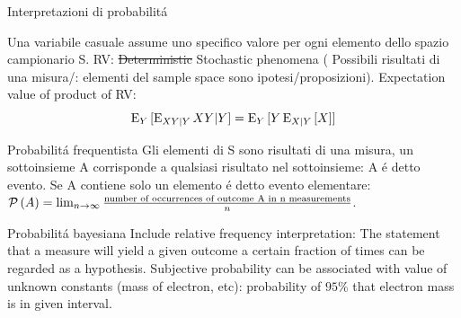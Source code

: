 \documentclass[asd-beamer.tex]{subfiles}%
\begin{document}
\begin{frame}{Interpretazioni di probabilit\'a}
\begin{block}{Una variabile casuale assume uno specifico valore per ogni elemento dello spazio campionario S.}
RV: \sout{Deterministic} Stochastic phenomena ( Possibili risultati di una misura/: elementi del sample space sono ipotesi/proposizioni). Expectation value of product of RV:%
\[\operatorname{E}_Y{[\operatorname{E}_{XY|Y}{XY|Y}]}=\operatorname{E}_Y{[Y\operatorname{E}_{X|Y}{[X]}]}\]
\end{block}
\begin{block}{Probabilit\'a frequentista}
Gli elementi di S sono risultati di una misura, un sottoinsieme A corrisponde a qualsiasi risultato nel sottoinsieme: A \'e detto evento. Se A contiene solo un elemento \'e detto evento elementare: $\operatorname{\mathcal{P}}{(A)}=\lim_{n\to\infty}\frac{\text{number of occurrences of outcome A in n measurements}}{n}$.
\end{block}
\begin{block}{Probabilit\'a bayesiana}
Include relative frequency interpretation: The statement that a measure will yield a given outcome a certain fraction of times can be regarded as a hypothesis.
Subjective probability can be associated with value of unknown constants (mass of electron, etc): probability of $95\%$ that electron mass is in given interval.
\end{block}
\end{frame}
\end{document}
